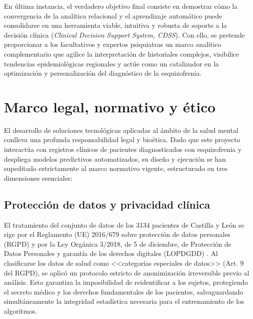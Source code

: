 \documentclass[12pt,a4paper,onecolumn,oneside]{report}
\begin{document}
En última instancia, el verdadero objetivo final consiste en demostrar cómo la convergencia de la analítica relacional y el aprendizaje automático puede consolidarse en una herramienta viable, intuitiva y robusta de soporte a la decisión clínica (\textit{Clinical Decision Support System, CDSS}). Con ello, se pretende proporcionar a los facultativos y expertos psiquiatras un marco analítico complementario que agilice la interpretación de historiales complejos, visibilice tendencias epidemiológicas regionales y actúe como un catalizador en la optimización y personalización del diagnóstico de la esquizofrenia.

\section{Marco legal, normativo y ético}

El desarrollo de soluciones tecnológicas aplicadas al ámbito de la salud mental conlleva una profunda responsabilidad legal y bioética. Dado que este proyecto interactúa con registros clínicos de pacientes diagnosticados con esquizofrenia y despliega modelos predictivos automatizados, su diseño y ejecución se han supeditado estrictamente al marco normativo vigente, estructurado en tres dimensiones esenciales:

\subsection{Protección de datos y privacidad clínica}
El tratamiento del conjunto de datos de los 3134 pacientes de Castilla y León se rige por el Reglamento (UE) 2016/679 sobre protección de datos personales (RGPD) \cite{rgpd2016} y por la Ley Orgánica 3/2018, de 5 de diciembre, de Protección de Datos Personales y garantía de los derechos digitales (LOPDGDD) \cite{lopdgdd2018}. Al clasificarse los datos de salud como <<categorías especiales de datos>> (Art. 9 del RGPD), se aplicó un protocolo estricto de anonimización irreversible previo al análisis. Esto garantiza la imposibilidad de reidentificar a los sujetos, protegiendo el secreto médico y los derechos fundamentales de los pacientes, salvaguardando simultáneamente la integridad estadística necesaria para el entrenamiento de los algoritmos.
\end{document}
